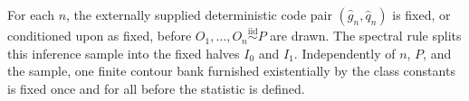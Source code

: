 For each \(n\), the externally supplied deterministic code pair \((\widehat g_n,\widehat q_n)\) is fixed, or conditioned upon as fixed, before \(O_1,\ldots,O_n\stackrel{\mathrm{iid}}{\sim}P\) are drawn.  The spectral rule splits this inference sample into the fixed halves \(I_0\) and \(I_1\).  Independently of \(n\), \(P\), and the sample, one finite contour bank furnished existentially by the class constants is fixed once and for all before the statistic is defined.